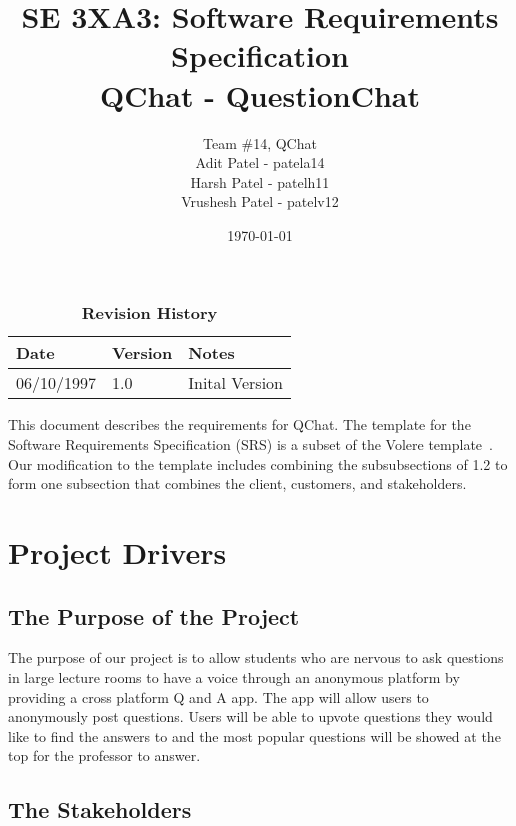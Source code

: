 \documentclass[12pt, titlepage]{article}
\title{SE 3XA3: Software Requirements Specification\\QChat - QuestionChat}
\author{Team \#14, QChat
		\\ Adit Patel - patela14
		\\ Harsh Patel - patelh11
		\\ Vrushesh Patel - patelv12
}
\date{\today}
\begin{document}
\maketitle

\tableofcontents
\listoftables
\listoffigures

\begin{table}[bp]
\caption{\bf Revision History}
\begin{tabularx}{\textwidth}{p{3cm}p{2cm}X}
\toprule {\bf Date} & {\bf Version} & {\bf Notes}\\
\midrule
06/10/1997 & 1.0 & Inital Version\\
\bottomrule
\end{tabularx}
\end{table}

\newpage


This document describes the requirements for QChat.  The template for the Software
Requirements Specification (SRS) is a subset of the Volere
template~\citep{RobertsonAndRobertson2012}. Our modification to the template includes combining the subsubsections of 1.2 to form one subsection that combines the client, customers, and stakeholders.

\section{Project Drivers}

\subsection{The Purpose of the Project}
The purpose of our project is to allow students who are nervous to ask questions in large lecture rooms to have a voice through an anonymous platform by providing a cross platform Q and A app. The app will allow users to anonymously post questions. Users will be able to upvote questions they would like to find the answers to and the most popular questions will be showed at the top for the professor to answer.

\subsection{The Stakeholders}
\end{document}
